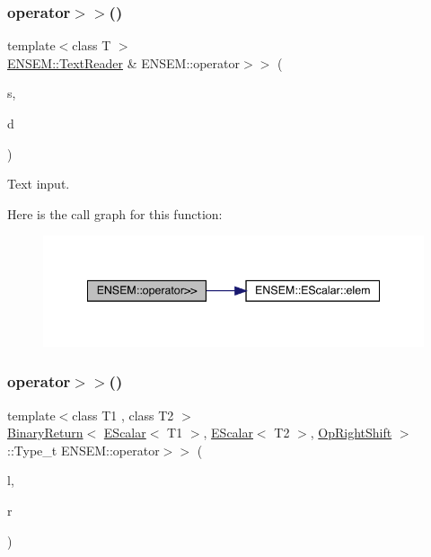 \subsubsection{\texorpdfstring{operator$>$$>$()}{operator>>()}\hspace{0.1cm}{\footnotesize\ttfamily [2/3]}}
{\footnotesize\ttfamily template$<$class T $>$ \\
\mbox{\hyperlink{classENSEM_1_1TextReader}{E\+N\+S\+E\+M\+::\+Text\+Reader}} \& E\+N\+S\+E\+M\+::operator$>$$>$ (\begin{DoxyParamCaption}\item[{\mbox{\hyperlink{classENSEM_1_1TextReader}{E\+N\+S\+E\+M\+::\+Text\+Reader}} \&}]{s,  }\item[{\mbox{\hyperlink{classENSEM_1_1EScalar}{E\+Scalar}}$<$ T $>$ \&}]{d }\end{DoxyParamCaption})\hspace{0.3cm}{\ttfamily [inline]}}



Text input. 

Here is the call graph for this function\+:
\nopagebreak
\begin{figure}[H]
\begin{center}
\leavevmode
\includegraphics[width=341pt]{d4/dca/group__escalar_ga0011ba4db6e989d9517d29f0dd411ba4_cgraph}
\end{center}
\end{figure}
\mbox{\label{group__escalar_gacaa61f35659a0336281352bbdbef1112}} 
\subsubsection{\texorpdfstring{operator$>$$>$()}{operator>>()}\hspace{0.1cm}{\footnotesize\ttfamily [3/3]}}
{\footnotesize\ttfamily template$<$class T1 , class T2 $>$ \\
\mbox{\hyperlink{structENSEM_1_1BinaryReturn}{Binary\+Return}}$<$ \mbox{\hyperlink{classENSEM_1_1EScalar}{E\+Scalar}}$<$ T1 $>$, \mbox{\hyperlink{classENSEM_1_1EScalar}{E\+Scalar}}$<$ T2 $>$, \mbox{\hyperlink{structENSEM_1_1OpRightShift}{Op\+Right\+Shift}} $>$\+::Type\+\_\+t E\+N\+S\+E\+M\+::operator$>$$>$ (\begin{DoxyParamCaption}\item[{const \mbox{\hyperlink{classENSEM_1_1EScalar}{E\+Scalar}}$<$ T1 $>$ \&}]{l,  }\item[{const \mbox{\hyperlink{classENSEM_1_1EScalar}{E\+Scalar}}$<$ T2 $>$ \&}]{r }\end{DoxyParamCaption})\hspace{0.3cm}{\ttfamily [inline]}}

